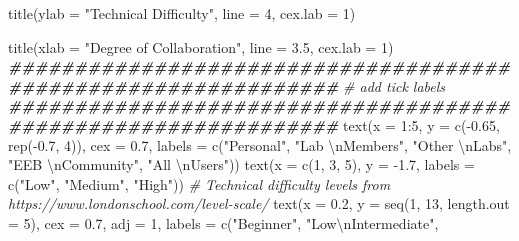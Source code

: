 \documentclass[
  11pt,
]{article}
\newenvironment{Shaded}{\begin{snugshade}}{\end{snugshade}}
\newcommand{\AttributeTok}[1]{\textcolor[rgb]{0.77,0.63,0.00}{#1}}
\newcommand{\CommentTok}[1]{\textcolor[rgb]{0.56,0.35,0.01}{\textit{#1}}}
\newcommand{\DecValTok}[1]{\textcolor[rgb]{0.00,0.00,0.81}{#1}}
\newcommand{\DocumentationTok}[1]{\textcolor[rgb]{0.56,0.35,0.01}{\textbf{\textit{#1}}}}
\newcommand{\FloatTok}[1]{\textcolor[rgb]{0.00,0.00,0.81}{#1}}
\newcommand{\FunctionTok}[1]{\textcolor[rgb]{0.00,0.00,0.00}{#1}}
\newcommand{\NormalTok}[1]{#1}
\newcommand{\SpecialCharTok}[1]{\textcolor[rgb]{0.00,0.00,0.00}{#1}}
\newcommand{\StringTok}[1]{\textcolor[rgb]{0.31,0.60,0.02}{#1}}
\begin{document}
\begin{Shaded}
\begin{Highlighting}[]
\FunctionTok{title}\NormalTok{(}\AttributeTok{ylab =} \StringTok{"Technical Difficulty"}\NormalTok{, }
      \AttributeTok{line =} \DecValTok{4}\NormalTok{, }
      \AttributeTok{cex.lab =} \DecValTok{1}\NormalTok{)}

\FunctionTok{title}\NormalTok{(}\AttributeTok{xlab =} \StringTok{"Degree of Collaboration"}\NormalTok{, }
      \AttributeTok{line =} \FloatTok{3.5}\NormalTok{, }
      \AttributeTok{cex.lab =} \DecValTok{1}\NormalTok{)}
\DocumentationTok{\#\#\#\#\#\#\#\#\#\#\#\#\#\#\#\#\#\#\#\#\#\#\#\#\#\#\#\#\#\#\#\#\#\#\#\#\#\#\#\#\#\#\#\#\#\#\#\#\#\#\#\#\#\#\#\#\#\#\#\#\#\#\#}
\CommentTok{\# add tick labels}
\DocumentationTok{\#\#\#\#\#\#\#\#\#\#\#\#\#\#\#\#\#\#\#\#\#\#\#\#\#\#\#\#\#\#\#\#\#\#\#\#\#\#\#\#\#\#\#\#\#\#\#\#\#\#\#\#\#\#\#\#\#\#\#\#\#\#\#}
\FunctionTok{text}\NormalTok{(}\AttributeTok{x =} \DecValTok{1}\SpecialCharTok{:}\DecValTok{5}\NormalTok{,}
     \AttributeTok{y =} \FunctionTok{c}\NormalTok{(}\SpecialCharTok{{-}}\FloatTok{0.65}\NormalTok{, }\FunctionTok{rep}\NormalTok{(}\SpecialCharTok{{-}}\FloatTok{0.7}\NormalTok{, }\DecValTok{4}\NormalTok{)), }
     \AttributeTok{cex =} \FloatTok{0.7}\NormalTok{,}
     \AttributeTok{labels =} \FunctionTok{c}\NormalTok{(}\StringTok{"Personal"}\NormalTok{, }
                \StringTok{"Lab }\SpecialCharTok{\textbackslash{}n}\StringTok{Members"}\NormalTok{, }
                \StringTok{"Other }\SpecialCharTok{\textbackslash{}n}\StringTok{Labs"}\NormalTok{, }
                \StringTok{"EEB }\SpecialCharTok{\textbackslash{}n}\StringTok{Community"}\NormalTok{, }
                \StringTok{"All }\SpecialCharTok{\textbackslash{}n}\StringTok{Users"}\NormalTok{))}
\FunctionTok{text}\NormalTok{(}\AttributeTok{x =} \FunctionTok{c}\NormalTok{(}\DecValTok{1}\NormalTok{, }\DecValTok{3}\NormalTok{, }\DecValTok{5}\NormalTok{),}
     \AttributeTok{y =} \SpecialCharTok{{-}}\FloatTok{1.7}\NormalTok{, }
     \AttributeTok{labels =} \FunctionTok{c}\NormalTok{(}\StringTok{"Low"}\NormalTok{, }\StringTok{"Medium"}\NormalTok{, }\StringTok{"High"}\NormalTok{))}
\CommentTok{\# Technical difficulty levels from https://www.londonschool.com/level{-}scale/}
\FunctionTok{text}\NormalTok{(}\AttributeTok{x =} \FloatTok{0.2}\NormalTok{,}
     \AttributeTok{y =} \FunctionTok{seq}\NormalTok{(}\DecValTok{1}\NormalTok{, }\DecValTok{13}\NormalTok{, }\AttributeTok{length.out =} \DecValTok{5}\NormalTok{),}
     \AttributeTok{cex =} \FloatTok{0.7}\NormalTok{,}
     \AttributeTok{adj =} \DecValTok{1}\NormalTok{,}
     \AttributeTok{labels =} \FunctionTok{c}\NormalTok{(}\StringTok{"Beginner"}\NormalTok{,}
                \StringTok{"Low}\SpecialCharTok{\textbackslash{}n}\StringTok{Intermediate"}\NormalTok{,}

\end{Highlighting}
\end{Shaded}
\end{document}
